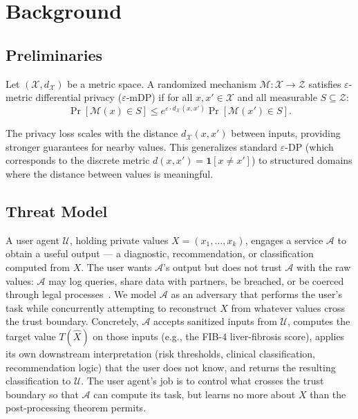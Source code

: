 \section{Background}

\subsection{Preliminaries}
\label{sec:preliminaries}
 
\begin{definition}
\label{def:mdp}
Let $(\mathcal{X}, d_{\mathcal{X}})$ be a metric space. A randomized mechanism $\mathcal{M}: \mathcal{X} \to \mathcal{Z}$ satisfies $\varepsilon$-metric differential privacy ($\varepsilon$-mDP) if for all $x, x' \in \mathcal{X}$ and all measurable $S \subseteq \mathcal{Z}$:
\[
    \Pr[\mathcal{M}(x) \in S] \leq e^{\varepsilon \cdot d_{\mathcal{X}}(x, x')} \Pr[\mathcal{M}(x') \in S].
\]
\end{definition}
 
\noindent The privacy loss scales with the distance $d_{\mathcal{X}}(x, x')$ between inputs, providing stronger guarantees for nearby values. This generalizes standard $\varepsilon$-DP (which corresponds to the discrete metric $d(x,x') = \mathbf{1}[x \neq x']$) to structured domains where the distance between values is meaningful.

\subsection{Threat Model}
\label{sec:threat-model}

A user agent $\mathcal{U}$, holding private values $X = (x_1, \ldots, x_k)$, engages a service $\mathcal{A}$ to obtain a useful output --- a diagnostic, recommendation, or classification computed from $X$. The user wants $\mathcal{A}$'s output but does not trust $\mathcal{A}$ with the raw values: $\mathcal{A}$ may log queries, share data with partners, be breached, or be coerced through legal processes~\cite{openai-nyt}. We model $\mathcal{A}$ as an adversary that performs the user's task while concurrently attempting to reconstruct $X$ from whatever values cross the trust boundary. Concretely, $\mathcal{A}$ accepts sanitized inputs from $\mathcal{U}$, computes the target value $T(\hat{X})$ on those inputs (e.g., the FIB-4 liver-fibrosis score), applies its own downstream interpretation (risk thresholds, clinical classification, recommendation logic) that the user does not know, and returns the resulting classification to $\mathcal{U}$. The user agent's job is to control what crosses the trust boundary so that $\mathcal{A}$ can compute its task, but learns no more about $X$ than the post-processing theorem permits.

